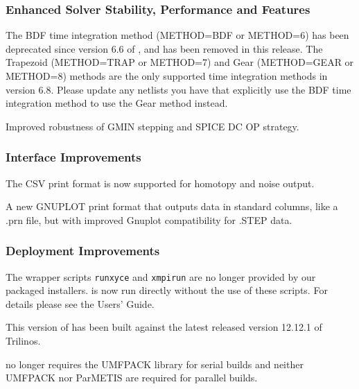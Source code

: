 \documentclass{article}
\begin{document}
\subsubsection*{Enhanced Solver Stability, Performance and Features}
\begin{XyceItemize}
 \item The BDF time integration method (METHOD=BDF or METHOD=6) has
   been deprecated since version 6.6 of \Xyce{}, and has been removed in
   this release. The Trapezoid (METHOD=TRAP or METHOD=7) and Gear
   (METHOD=GEAR or METHOD=8) methods are the only supported time
   integration methods in version 6.8.  Please update any netlists you
   have that explicitly use the BDF time integration method to use the
   Gear method instead.

 \item Improved robustness of GMIN stepping and SPICE DC OP strategy.
\end{XyceItemize}

\subsubsection*{Interface Improvements}
\begin{XyceItemize}
\item The CSV print format is now supported for homotopy and noise output.
\item A new GNUPLOT print format that outputs data in standard columns, like a
.prn file, but with improved Gnuplot compatibility for .STEP data.
\end{XyceItemize}

\subsubsection*{Deployment Improvements}
\begin{XyceItemize}
\item The wrapper scripts \texttt{runxyce} and \texttt{xmpirun} are no
  longer provided by our packaged installers.  \Xyce{} is now run
  directly without the use of these scripts.  For details please see
  the \Xyce{} Users' Guide.
\item This version of \Xyce{} has been built against the latest
  released version 12.12.1 of Trilinos.
\item \Xyce{} no longer requires the UMFPACK library for serial builds 
  and neither UMFPACK nor ParMETIS are required for parallel builds.
\end{XyceItemize}
\end{document}
